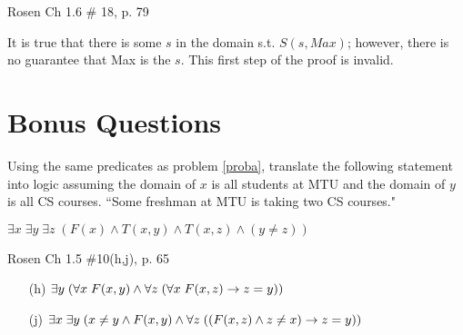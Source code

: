 \begin{questions}
 Rosen Ch 1.6 \# 18, p. 79
    \ifprintanswers
        \vspace{-10pt}
    \fi
\begin{solution}
    It is true that there is some $s$ in the domain s.t. $S(s,Max)$; however, there is no guarantee that Max is the $s$.  This first step of the proof is invalid.
\end{solution}


\section*{Bonus Questions}


\bonusquestion[2] Using the same predicates as problem \ref{proba}, translate the following statement into logic assuming the domain of $x$ is all students at MTU and the domain of $y$ is all CS courses.
``Some freshman at MTU is taking two CS courses."
    \ifprintanswers
        \vspace{-12pt}
    \fi
\begin{solution}
  $\exists x\; \exists y\; \exists z\;(F(x) \wedge T(x,y) \wedge T(x,z) \wedge (y \neq z))$
\end{solution}



\bonusquestion[2] Rosen Ch 1.5 \#10(h,j), p. 65
    \ifprintanswers
        \vspace{-12pt}
    \fi
  \begin{solution}
      \begin{itemize}[itemsep=0pt,parsep=0pt,topsep=0pt,partopsep=0pt]
         \item[(h)] $\exists y\; (\forall x\; F(x,y) \wedge \forall z\; (\forall x\; F(x,z) \rightarrow z = y))$
         \item[(j)] $\exists x\; \exists y\; (x \neq y \wedge F(x,y) \wedge \forall z\; ((F(x,z) \wedge z \neq x) \rightarrow z = y))$
      \end{itemize}
  \end{solution}


\end{questions}


